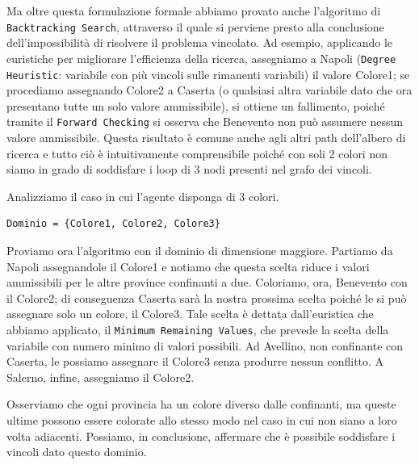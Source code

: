		Ma oltre questa formulazione formale abbiamo provato anche l'algoritmo di \texttt{Backtracking Search}, attraverso il quale si perviene presto alla conclusione dell'impossibilità di risolvere il problema vincolato. Ad esempio, applicando le euristiche per migliorare l'efficienza della ricerca, assegniamo a Napoli (\texttt{Degree Heuristic}: variabile con più vincoli sulle rimanenti variabili) il valore Colore1; se procediamo assegnando Colore2 a Caserta (o qualsiasi altra variabile dato che ora presentano tutte un solo valore ammissibile), si ottiene un fallimento, poiché tramite il \texttt{Forward Checking} si osserva che Benevento non può assumere nessun valore ammissibile. Questa risultato è comune anche agli altri path dell'albero di ricerca e tutto ciò è intuitivamente comprensibile poiché con soli 2 colori non siamo in grado di soddisfare i loop di 3 nodi presenti nel grafo dei vincoli.\par
		\bigskip
		Analizziamo il caso in cui l'agente disponga di 3 colori.
		\begin{lstlisting}
Dominio = {Colore1, Colore2, Colore3}
		\end{lstlisting}
		Proviamo ora l'algoritmo con il dominio di dimensione maggiore. Partiamo da Napoli assegnandole il Colore1 e notiamo che questa scelta riduce i valori ammissibili per le altre province confinanti a due. Coloriamo, ora, Benevento con il Colore2; di conseguenza Caserta sarà la nostra prossima scelta poiché le si può assegnare solo un colore, il Colore3. Tale scelta è dettata dall'euristica che abbiamo applicato, il \texttt{Minimum Remaining Values}, che prevede la scelta della variabile con numero minimo di valori possibili. Ad Avellino, non confinante con Caserta, le possiamo assegnare il Colore3 senza produrre nessun conflitto. A Salerno, infine, assegniamo il Colore2.\par 
		Osserviamo che ogni provincia ha un colore diverso dalle confinanti, ma queste ultime  possono essere colorate allo stesso modo nel caso in cui non siano a loro volta adiacenti. Possiamo, in conclusione, affermare che è possibile soddisfare i vincoli dato questo dominio.
